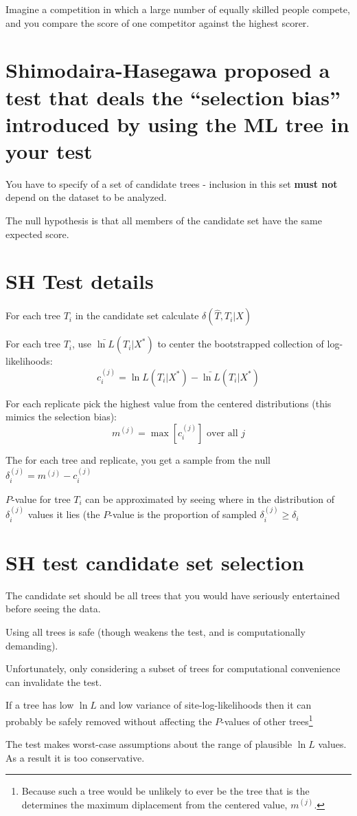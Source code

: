 \documentclass[landscape]{foils}
\begin{document}
Imagine a competition in which a large number of equally skilled people compete, and you compare the score of one competitor against the highest scorer.

\myNewSlide
\section*{Shimodaira-Hasegawa proposed a test that deals the ``selection bias'' introduced by using the ML tree in your test}
You have to specify of a set of candidate trees - inclusion in this set {\bf must not} depend on the dataset to be analyzed.

The null hypothesis is that all members of the candidate set have the same expected score.

\myNewSlide
\section*{SH Test details}
\normalsize
\begin{compactitem}
	\item For each tree $T_i$ in the candidate set calculate $\delta(\hat{T}, T_i|X)$
	\item For each tree $T_i$, use $\bar{\ln L}(T_i|X^{\ast})$ to center the bootstrapped collection of log-likelihoods:
		$$c_i^{(j)} = {\ln L}(T_i|X^{\ast})-\bar{\ln L}(T_i|X^{\ast})$$
	\item For each replicate pick the highest value from the centered distributions (this mimics the selection bias): $$m^{(j)} = \max\left[c_i^{(j)}\right] \mbox{ over all } j$$
	\item The for each tree and replicate, you get a sample from the null $\delta_i^{(j)} = m^{(j)} - c_i^{(j)}$
	\item $P$-value for tree $T_i$ can be approximated by seeing where in the distribution of $\delta_i^{(j)}$ values it lies (the $P$-value is the proportion of sampled $\delta_i^{(j)} \geq \delta_i$
\end{compactitem}

\myNewSlide
\section*{SH test candidate set selection}
\large
\begin{compactitem}
	\item The candidate set should be all trees that you would have seriously entertained before seeing the data. 
	\item Using all trees is safe (though weakens the test, and is computationally demanding).
	\item Unfortunately, only considering a subset of trees for computational convenience can invalidate the test.
	\item If a tree has low $\ln L$ and low variance of site-log-likelihoods then it can probably be safely removed without affecting the $P$-values of other trees\footnote{Because such a tree would be unlikely to ever be the tree that is the determines the maximum diplacement from the centered value, $m^{(j)}$.}
\end{compactitem}
The test makes worst-case assumptions about the range of plausible $\ln L$ values. As a result it is too conservative.
\end{document}
